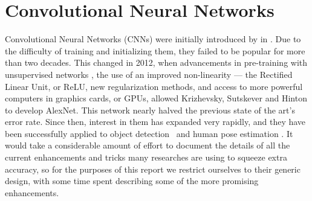 % 
% 
\section{Convolutional Neural Networks}\label{sec:cnns}
  Convolutional Neural Networks (CNNs) were initially introduced by \citet{lecun_backpropagation_1989} in
  \citep{lecun_backpropagation_1989}. Due to the difficulty of training and
  initializing them, they failed to be popular for more than two decades.  This
  changed in 2012, when advancements in pre-training with unsupervised networks
  \citep{bengio_greedy_2007}, the use of an improved non-linearity --- the Rectified Linear
  Unit, or ReLU, new regularization methods\citep{hinton_improving_2012}, and
  access to more powerful computers in graphics cards, or GPUs, allowed
  Krizhevsky, Sutskever and Hinton  to develop
  AlexNet\citep{krizhevsky_imagenet_2012}. This network nearly halved the
  previous state of the art's error rate.  Since then, interest in them has
  expanded very rapidly, and they have been successfully applied to object
  detection~\citep{ren_object_2015} and human pose estimation
  \citep{tompson_efficient_2015}. It would take a considerable amount of effort
  to document the details of all the current enhancements and tricks many
  researches are using to squeeze extra accuracy, so for the purposes of this
  report we restrict ourselves to their generic design, with some time spent
  describing some of the more promising enhancements. 
  

